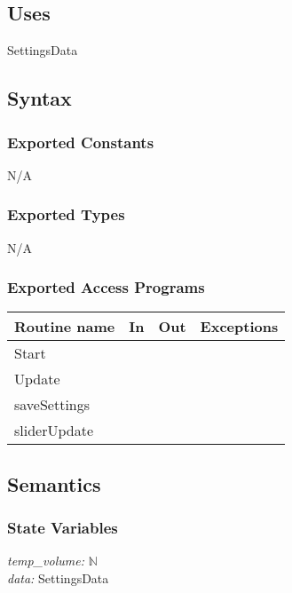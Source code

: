 \documentclass[12pt]{article}
\begin{document}
\subsection {Uses}
SettingsData

\subsection {Syntax}

\subsubsection {Exported Constants}
N/A
\subsubsection {Exported Types}
N/A
\subsubsection {Exported Access Programs}

\begin{tabular}{| l | l | l | l |}
\hline
\textbf{Routine name} & \textbf{In} & \textbf{Out} & \textbf{Exceptions}\\
\hline
Start    &      &           &          \\
\hline
Update   &     &           &          \\
\hline
saveSettings    &          &     &          \\
\hline
sliderUpdate   &          &     &          \\
\hline
\end{tabular}

\subsection {Semantics}

\subsubsection {State Variables}
\textit{temp\_volume:} $\mathbb{N}$\\
\textit{data:} SettingsData
\end{document}
